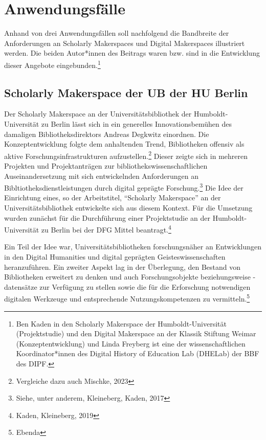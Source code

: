 \documentclass[a4paper,
fontsize=11pt,
oneside,
numbers=noperiodatend,
parskip=half-,
bibliography=totoc,
final
]{scrartcl}
\begin{document}
\hypertarget{anwendungsfuxe4lle}{%
\section{Anwendungsfälle}\label{anwendungsfuxe4lle}}

Anhand von drei Anwendungsfällen soll nachfolgend die Bandbreite der
Anforderungen an Scholarly Makerspaces und Digital Makerspaces
illustriert werden. Die beiden Autor*innen des Beitrags waren bzw. sind
in die Entwicklung dieser Angebote eingebunden.\footnote{Ben Kaden in
  den Scholarly Makerspace der Humboldt-Universität (Projektstudie) und
  den Digital Makerspace an der Klassik Stiftung Weimar
  (Konzeptentwicklung) und Linda Freyberg ist eine der
  wissenschaftlichen Koordinator*innen des Digital History of Education
  Lab (DHELab) der BBF des DIPF.}

\hypertarget{scholarly-makerspace-der-ub-der-hu-berlin}{%
\subsection{Scholarly Makerspace der UB der HU
Berlin}\label{scholarly-makerspace-der-ub-der-hu-berlin}}

Der Scholarly Makerspace an der Universitätsbibliothek der
Humboldt-Universität zu Berlin lässt sich in ein generelles
Innovationsbemühen des damaligen Bibliotheksdirektors Andreas Degkwitz
einordnen. Die Konzeptentwicklung folgte dem anhaltenden Trend,
Bibliotheken offensiv als aktive Forschungsinfrastrukturen
aufzustellen.\footnote{Vergleiche dazu auch Mischke, 2023} Dieser zeigte
sich in mehreren Projekten und Projektanträgen zur
bibliothekswissenschaftlichen Auseinandersetzung mit sich entwickelnden
Anforderungen an Bibltiotheksdienstleistungen durch digital geprägte
Forschung.\footnote{Siehe, unter anderem, Kleineberg, Kaden, 2017} Die
Idee der Einrichtung eines, so der Arbeitstitel, \enquote{Scholarly
Makerspace} an der Universitätsbibliothek entwickelte sich aus diesem
Kontext. Für die Umsetzung wurden zunächst für die Durchführung einer
Projektstudie an der Humboldt-Universität zu Berlin bei der DFG Mittel
beantragt.\footnote{Kaden, Kleineberg, 2019}

Ein Teil der Idee war, Universitätsbibliotheken forschungsnäher an
Entwicklungen in den Digital Humanities und digital geprägten
Geisteswissenschaften heranzuführen. Ein zweiter Aspekt lag in der
Überlegung, den Bestand von Bibliotheken erweitert zu denken und auch
Forschungsobjekte beziehungsweise -datensätze zur Verfügung zu stellen
sowie die für die Erforschung notwendigen digitalen Werkzeuge und
entsprechende Nutzungskompetenzen zu vermitteln.\footnote{Ebenda}
\end{document}
